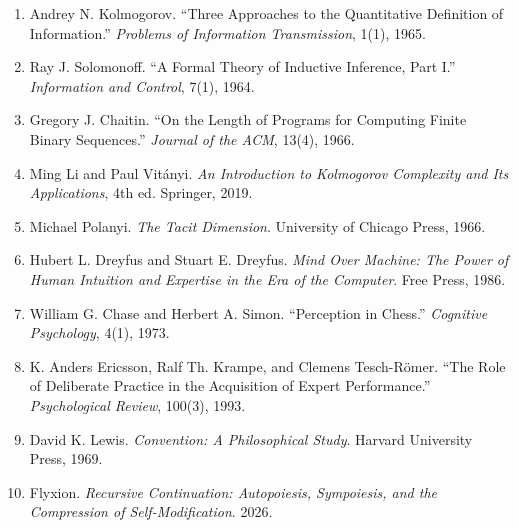 \documentclass[11pt]{article}
\begin{document}
\begin{enumerate}
\item Andrey N. Kolmogorov. ``Three Approaches to the Quantitative Definition of Information.'' \emph{Problems of Information Transmission}, 1(1), 1965.
\item Ray J. Solomonoff. ``A Formal Theory of Inductive Inference, Part I.'' \emph{Information and Control}, 7(1), 1964.
\item Gregory J. Chaitin. ``On the Length of Programs for Computing Finite Binary Sequences.'' \emph{Journal of the ACM}, 13(4), 1966.
\item Ming Li and Paul Vit\'anyi. \emph{An Introduction to Kolmogorov Complexity and Its Applications}, 4th ed. Springer, 2019.
\item Michael Polanyi. \emph{The Tacit Dimension}. University of Chicago Press, 1966.
\item Hubert L. Dreyfus and Stuart E. Dreyfus. \emph{Mind Over Machine: The Power of Human Intuition and Expertise in the Era of the Computer}. Free Press, 1986.
\item William G. Chase and Herbert A. Simon. ``Perception in Chess.'' \emph{Cognitive Psychology}, 4(1), 1973.
\item K. Anders Ericsson, Ralf Th. Krampe, and Clemens Tesch-R\"omer. ``The Role of Deliberate Practice in the Acquisition of Expert Performance.'' \emph{Psychological Review}, 100(3), 1993.
\item David K. Lewis. \emph{Convention: A Philosophical Study}. Harvard University Press, 1969.
\item Flyxion. \emph{Recursive Continuation: Autopoiesis, Sympoiesis, and the Compression of Self-Modification}. 2026.
\end{enumerate}
\end{document}
